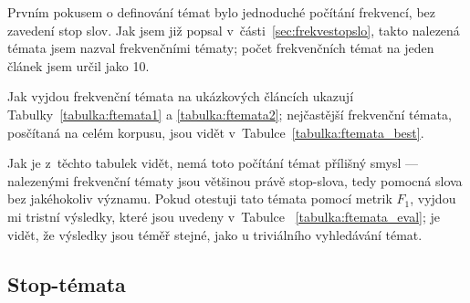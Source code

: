\documentclass[12pt,a4paper]{report}
\begin{document}

Prvním pokusem o definování témat bylo jednoduché počítání frekvencí, bez zavedení stop slov. Jak jsem již popsal v~části~\ref{sec:frekvestopslo}, takto nalezená témata jsem nazval frekvenčními tématy; počet frekvenčních témat na jeden článek jsem určil jako 10. 

Jak vyjdou frekvenční témata na ukázkových článcích ukazují Tabulky~\ref{tabulka:ftemata1} a \ref{tabulka:ftemata2}; nejčastější frekvenční témata, posčítaná na celém korpusu, jsou vidět v~Ta\-bul\-ce~\ref{tabulka:ftemata_best}. 

Jak je z~těchto tabulek vidět, nemá toto počítání témat přílišný smysl --- nalezenými frekvenční tématy jsou většinou právě stop-slova, tedy pomocná slova bez jakéhokoliv významu. Pokud otestuji tato témata pomocí metrik $F_1$, vyjdou mi tristní výsledky, které jsou uvedeny v~Tabulce ~\ref{tabulka:ftemata_eval}; je vidět, že výsledky jsou té\-měř stej\-né, jako u triviálního vyhledávání témat.


\subsection{Stop-témata}
\label{sec:stemata}


\end{document}

